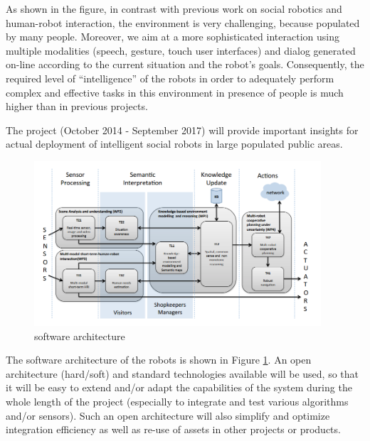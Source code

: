 As shown in the figure, in contrast with previous work on social robotics and human-robot interaction, the \coaches environment is very challenging, because populated by many people.
Moreover, we aim at a more sophisticated interaction using multiple modalities (speech, gesture, touch user interfaces) and dialog generated on-line according to the current situation
and the robot's goals.
Consequently, the required level of ``intelligence'' of the \coaches robots in order to adequately perform complex and effective tasks in this environment in presence of people is much higher than in previous projects.

The \coaches project (October 2014 - September 2017) will provide important insights for actual deployment of intelligent social robots in large populated public areas. 



\begin{figure}
\centering
\includegraphics[width=0.95\textwidth]{fig/COACHES_swarch.png}
\caption{\coaches software architecture}
\label{fig:swarch}
\end{figure}

The software architecture of the \coaches robots is shown in Figure \ref{fig:swarch}.
An open architecture (hard/soft) and standard technologies available will be used, 
so that it will be easy to extend and/or adapt the capabilities of the system during the whole length of 
the  project  (especially  to  integrate  and  test  various  algorithms  and/or  sensors).  
Such an open architecture will also simplify and optimize integration efficiency as well as re-use of assets in other projects or products. 


